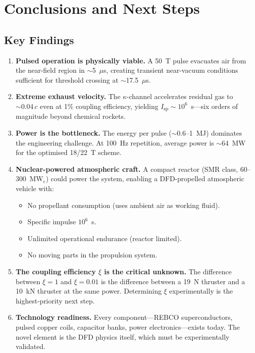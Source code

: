 \documentclass[amsmath,amssymb,aps,prd,superscriptaddress,nofootinbib]{revtex4-2}
\begin{document}
\section{Conclusions and Next Steps}\label{sec:conclusions}

\subsection{Key Findings}

\begin{enumerate}
\item \textbf{Pulsed operation is physically viable.} A 50~T pulse
  evacuates air from the near-field region in $\sim$5~$\mu$s, creating
  transient near-vacuum conditions sufficient for threshold crossing
  at $\sim$17.5~$\mu$s.

\item \textbf{Extreme exhaust velocity.} The $\kappa$-channel
  accelerates residual gas to $\sim 0.04\,c$ even at 1\% coupling
  efficiency, yielding $I_\text{sp} \sim 10^6$~s---six orders of
  magnitude beyond chemical rockets.

\item \textbf{Power is the bottleneck.} The energy per pulse
  ($\sim$0.6--1~MJ) dominates the engineering challenge. At 100~Hz
  repetition, average power is $\sim$64~MW for the optimised 18/22~T
  scheme.

\item \textbf{Nuclear-powered atmospheric craft.} A compact reactor
  (SMR class, 60--300~MW$_e$) could power the system, enabling a
  DFD-propelled atmospheric vehicle with:
  \begin{itemize}
  \item No propellant consumption (uses ambient air as working fluid).
  \item Specific impulse $10^6$~s.
  \item Unlimited operational endurance (reactor limited).
  \item No moving parts in the propulsion system.
  \end{itemize}

\item \textbf{The coupling efficiency $\xi$ is the critical unknown.}
  The difference between $\xi = 1$ and $\xi = 0.01$ is the difference
  between a 19~N thruster and a 10~kN thruster at the same power.
  Determining $\xi$ experimentally is the highest-priority next step.

\item \textbf{Technology readiness.} Every component---REBCO
  superconductors, pulsed copper coils, capacitor banks, power
  electronics---exists today. The novel element is the DFD physics
  itself, which must be experimentally validated.
\end{enumerate}
\end{document}
